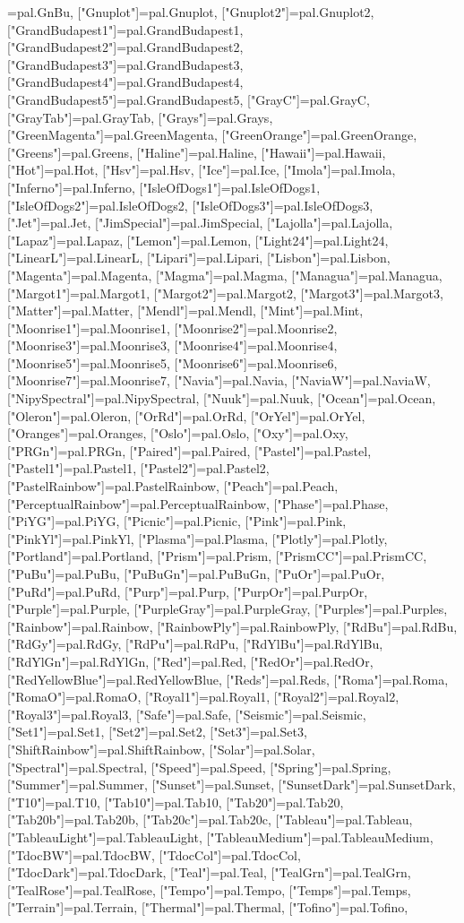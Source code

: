 \documentclass[10pt,a4paper,twocolumn]{article}%
\begin{document}
\begin{luacode*}
["GnBu"]=pal.GnBu, ["Gnuplot"]=pal.Gnuplot, ["Gnuplot2"]=pal.Gnuplot2, ["GrandBudapest1"]=pal.GrandBudapest1, ["GrandBudapest2"]=pal.GrandBudapest2, ["GrandBudapest3"]=pal.GrandBudapest3, ["GrandBudapest4"]=pal.GrandBudapest4, ["GrandBudapest5"]=pal.GrandBudapest5, ["GrayC"]=pal.GrayC, ["GrayTab"]=pal.GrayTab, ["Grays"]=pal.Grays, ["GreenMagenta"]=pal.GreenMagenta, ["GreenOrange"]=pal.GreenOrange, ["Greens"]=pal.Greens, ["Haline"]=pal.Haline, ["Hawaii"]=pal.Hawaii, ["Hot"]=pal.Hot, ["Hsv"]=pal.Hsv, ["Ice"]=pal.Ice, ["Imola"]=pal.Imola, ["Inferno"]=pal.Inferno, ["IsleOfDogs1"]=pal.IsleOfDogs1, ["IsleOfDogs2"]=pal.IsleOfDogs2, ["IsleOfDogs3"]=pal.IsleOfDogs3, ["Jet"]=pal.Jet, ["JimSpecial"]=pal.JimSpecial, ["Lajolla"]=pal.Lajolla, ["Lapaz"]=pal.Lapaz, ["Lemon"]=pal.Lemon, ["Light24"]=pal.Light24, ["LinearL"]=pal.LinearL, ["Lipari"]=pal.Lipari, ["Lisbon"]=pal.Lisbon, ["Magenta"]=pal.Magenta, ["Magma"]=pal.Magma, ["Managua"]=pal.Managua, ["Margot1"]=pal.Margot1, ["Margot2"]=pal.Margot2, ["Margot3"]=pal.Margot3, ["Matter"]=pal.Matter, ["Mendl"]=pal.Mendl, ["Mint"]=pal.Mint, ["Moonrise1"]=pal.Moonrise1, ["Moonrise2"]=pal.Moonrise2, ["Moonrise3"]=pal.Moonrise3, ["Moonrise4"]=pal.Moonrise4, ["Moonrise5"]=pal.Moonrise5, ["Moonrise6"]=pal.Moonrise6, ["Moonrise7"]=pal.Moonrise7, ["Navia"]=pal.Navia, ["NaviaW"]=pal.NaviaW, ["NipySpectral"]=pal.NipySpectral, ["Nuuk"]=pal.Nuuk, ["Ocean"]=pal.Ocean, ["Oleron"]=pal.Oleron, ["OrRd"]=pal.OrRd, ["OrYel"]=pal.OrYel, ["Oranges"]=pal.Oranges, ["Oslo"]=pal.Oslo, ["Oxy"]=pal.Oxy, ["PRGn"]=pal.PRGn, ["Paired"]=pal.Paired, ["Pastel"]=pal.Pastel, ["Pastel1"]=pal.Pastel1, ["Pastel2"]=pal.Pastel2, ["PastelRainbow"]=pal.PastelRainbow, ["Peach"]=pal.Peach, ["PerceptualRainbow"]=pal.PerceptualRainbow, ["Phase"]=pal.Phase, ["PiYG"]=pal.PiYG, ["Picnic"]=pal.Picnic, ["Pink"]=pal.Pink, ["PinkYl"]=pal.PinkYl, ["Plasma"]=pal.Plasma, ["Plotly"]=pal.Plotly, ["Portland"]=pal.Portland, ["Prism"]=pal.Prism, ["PrismCC"]=pal.PrismCC, ["PuBu"]=pal.PuBu, ["PuBuGn"]=pal.PuBuGn, ["PuOr"]=pal.PuOr, ["PuRd"]=pal.PuRd, ["Purp"]=pal.Purp, ["PurpOr"]=pal.PurpOr, ["Purple"]=pal.Purple, ["PurpleGray"]=pal.PurpleGray, ["Purples"]=pal.Purples, ["Rainbow"]=pal.Rainbow, ["RainbowPly"]=pal.RainbowPly, ["RdBu"]=pal.RdBu, ["RdGy"]=pal.RdGy, ["RdPu"]=pal.RdPu, ["RdYlBu"]=pal.RdYlBu, ["RdYlGn"]=pal.RdYlGn, ["Red"]=pal.Red, ["RedOr"]=pal.RedOr, ["RedYellowBlue"]=pal.RedYellowBlue, ["Reds"]=pal.Reds, ["Roma"]=pal.Roma, ["RomaO"]=pal.RomaO, ["Royal1"]=pal.Royal1, ["Royal2"]=pal.Royal2, ["Royal3"]=pal.Royal3, ["Safe"]=pal.Safe, ["Seismic"]=pal.Seismic, ["Set1"]=pal.Set1, ["Set2"]=pal.Set2, ["Set3"]=pal.Set3, ["ShiftRainbow"]=pal.ShiftRainbow, ["Solar"]=pal.Solar, ["Spectral"]=pal.Spectral, ["Speed"]=pal.Speed, ["Spring"]=pal.Spring, ["Summer"]=pal.Summer, ["Sunset"]=pal.Sunset, ["SunsetDark"]=pal.SunsetDark, ["T10"]=pal.T10, ["Tab10"]=pal.Tab10, ["Tab20"]=pal.Tab20, ["Tab20b"]=pal.Tab20b, ["Tab20c"]=pal.Tab20c, ["Tableau"]=pal.Tableau, ["TableauLight"]=pal.TableauLight, ["TableauMedium"]=pal.TableauMedium, ["TdocBW"]=pal.TdocBW, ["TdocCol"]=pal.TdocCol, ["TdocDark"]=pal.TdocDark, ["Teal"]=pal.Teal, ["TealGrn"]=pal.TealGrn, ["TealRose"]=pal.TealRose, ["Tempo"]=pal.Tempo, ["Temps"]=pal.Temps, ["Terrain"]=pal.Terrain, ["Thermal"]=pal.Thermal, ["Tofino"]=pal.Tofino, 
\end{luacode*}
\end{document}
